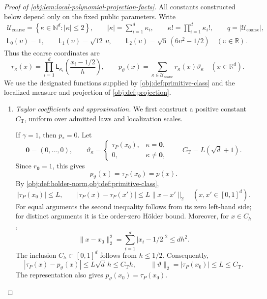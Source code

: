 \documentclass[11pt]{article}
\begin{document}
\begin{proof}[Proof of \cref{obj:lem:local-polynomial-projection-facts}]
All constants constructed below depend only on the fixed public parameters. Write
\[
\begin{gathered}
\mathcal U_{\mathrm{coarse}}
 =\left\{\kappa\in\mathbb N^d:|\kappa|\le2\right\},
\qquad
|\kappa|=\sum_{i=1}^d\kappa_i,
\qquad
\kappa!=\prod_{i=1}^d\kappa_i!,
\qquad
q=|\mathcal U_{\mathrm{coarse}}|,\\
\mathsf L_0(\upsilon)=1,\qquad
\mathsf L_1(\upsilon)=\sqrt{12}\,\upsilon,\qquad
\mathsf L_2(\upsilon)=\sqrt5\,(6\upsilon^2-1/2)
\quad(\upsilon\in\mathbb R).
\end{gathered}
\]
Thus the coarse coordinates are
\[
r_\kappa(x)
 =\prod_{i=1}^d
   \mathsf L_{\kappa_i}\!\left(\frac{x_i-1/2}{h}\right),
\qquad
p_\vartheta(x)=\sum_{\kappa\in\mathcal U_{\mathrm{coarse}}}
r_\kappa(x)\vartheta_\kappa
\quad(x\in\mathbb R^d).
\]
We use the designated functions supplied by \cref{obj:def:primitive-class} and the localized measure and projection of \cref{obj:def:projection}.

\begin{enumerate}
\item \emph{Taylor coefficients and approximation.}
We first construct a positive constant \(C_{\mathrm T}\), uniform over admitted laws and localization scales.

If \(\gamma=1\), then \(p_*=0\). Let
\[
\mathbf0=(0,\ldots,0),\qquad
\vartheta_\kappa=
\begin{cases}
\tau_P(x_0),&\kappa=\mathbf0,\\
0,&\kappa\ne\mathbf0,
\end{cases}
\qquad
C_{\mathrm T}=L(\sqrt d+1).
\]
Since \(r_{\mathbf0}=1\), this gives
\[
p_\vartheta(x)=\tau_P(x_0)=p(x).
\]
By \cref{obj:def:holder-norm,obj:def:primitive-class},
\[
|\tau_P(x_0)|\le L,
\qquad
|\tau_P(x)-\tau_P(x')|\le L\|x-x'\|_2
\quad(x,x'\in[0,1]^d).
\]
For equal arguments the second inequality follows from its zero left-hand side; for distinct arguments it is the order-zero Hölder bound. Moreover, for \(x\in C_h\),
\[
\|x-x_0\|_2^2
 =\sum_{i=1}^d|x_i-1/2|^2
 \le dh^2.
\]
The inclusion \(C_h\subset[0,1]^d\) follows from \(h\le1/2\). Consequently,
\[
|\tau_P(x)-p_\vartheta(x)|
 \le L\sqrt d\,h
 \le C_{\mathrm T}h,
\qquad
\|\vartheta\|_2=|\tau_P(x_0)|\le L\le C_{\mathrm T}.
\]
The representation also gives \(p_\vartheta(x_0)=\tau_P(x_0)\).


\end{enumerate}
\end{proof}
\end{document}
